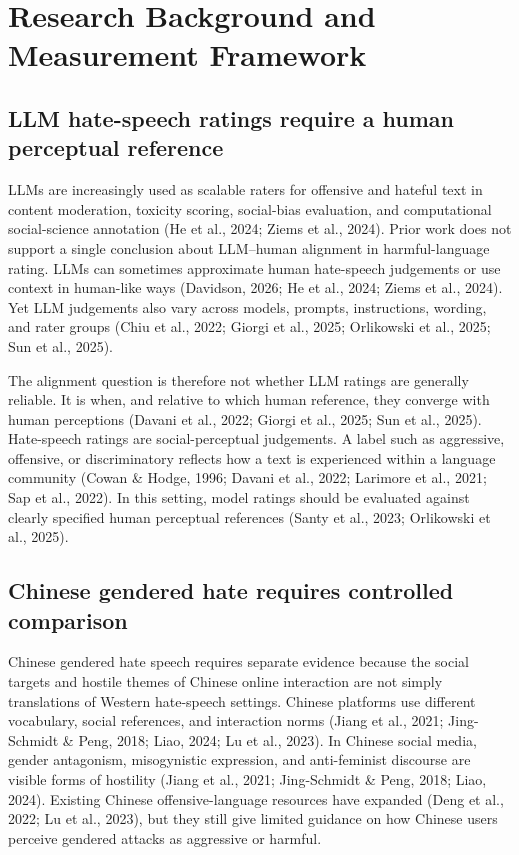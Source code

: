 \documentclass[a4paper,fleqn,review]{cas-sc}
\begin{document}
\section{Research Background and Measurement Framework}
\label{sec:background-framework}

\subsection{LLM hate-speech ratings require a human perceptual reference}

LLMs are increasingly used as scalable raters for offensive and hateful text in content moderation, toxicity scoring, social-bias evaluation, and computational social-science annotation (He et al., 2024; Ziems et al., 2024). Prior work does not support a single conclusion about LLM--human alignment in harmful-language rating. LLMs can sometimes approximate human hate-speech judgements or use context in human-like ways (Davidson, 2026; He et al., 2024; Ziems et al., 2024). Yet LLM judgements also vary across models, prompts, instructions, wording, and rater groups (Chiu et al., 2022; Giorgi et al., 2025; Orlikowski et al., 2025; Sun et al., 2025).

The alignment question is therefore not whether LLM ratings are generally reliable. It is when, and relative to which human reference, they converge with human perceptions (Davani et al., 2022; Giorgi et al., 2025; Sun et al., 2025). Hate-speech ratings are social-perceptual judgements. A label such as aggressive, offensive, or discriminatory reflects how a text is experienced within a language community (Cowan \& Hodge, 1996; Davani et al., 2022; Larimore et al., 2021; Sap et al., 2022). In this setting, model ratings should be evaluated against clearly specified human perceptual references (Santy et al., 2023; Orlikowski et al., 2025).

\subsection{Chinese gendered hate requires controlled comparison}

Chinese gendered hate speech requires separate evidence because the social targets and hostile themes of Chinese online interaction are not simply translations of Western hate-speech settings. Chinese platforms use different vocabulary, social references, and interaction norms (Jiang et al., 2021; Jing-Schmidt \& Peng, 2018; Liao, 2024; Lu et al., 2023). In Chinese social media, gender antagonism, misogynistic expression, and anti-feminist discourse are visible forms of hostility (Jiang et al., 2021; Jing-Schmidt \& Peng, 2018; Liao, 2024). Existing Chinese offensive-language resources have expanded (Deng et al., 2022; Lu et al., 2023), but they still give limited guidance on how Chinese users perceive gendered attacks as aggressive or harmful.
\end{document}
